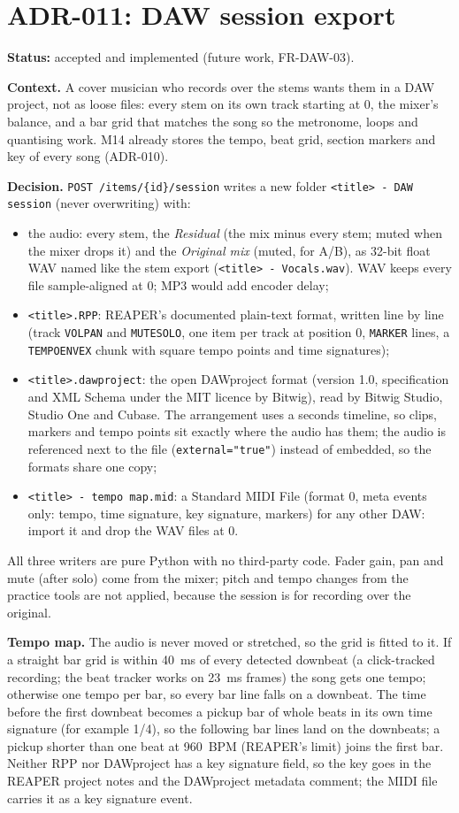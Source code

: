 \section{ADR-011: DAW session export}
\textbf{Status:} accepted and implemented (future work, FR-DAW-03).

\textbf{Context.} A cover musician who records over the stems wants them in a
DAW project, not as loose files: every stem on its own track starting at 0, the
mixer's balance, and a bar grid that matches the song so the metronome, loops
and quantising work. M14 already stores the tempo, beat grid, section markers
and key of every song (ADR-010).

\textbf{Decision.} \texttt{POST /items/\{id\}/session} writes a new folder
\texttt{<title> - DAW session} (never overwriting) with:
\begin{itemize}
  \item the audio: every stem, the \emph{Residual} (the mix minus every stem;
  muted when the mixer drops it) and the \emph{Original mix} (muted, for A/B),
  as 32-bit float WAV named like the stem export
  (\texttt{<title> - Vocals.wav}). WAV keeps every file sample-aligned at 0;
  MP3 would add encoder delay;
  \item \texttt{<title>.RPP}: REAPER's documented plain-text format, written
  line by line (track \texttt{VOLPAN} and \texttt{MUTESOLO}, one item per track
  at position 0, \texttt{MARKER} lines, a \texttt{TEMPOENVEX} chunk with square
  tempo points and time signatures);
  \item \texttt{<title>.dawproject}: the open DAWproject format (version 1.0,
  specification and XML Schema under the MIT licence by Bitwig), read by
  Bitwig Studio, Studio One and Cubase. The arrangement uses a seconds
  timeline, so clips, markers and tempo points sit exactly where the audio has
  them; the audio is referenced next to the file (\texttt{external="true"})
  instead of embedded, so the formats share one copy;
  \item \texttt{<title> - tempo map.mid}: a Standard MIDI File (format 0, meta
  events only: tempo, time signature, key signature, markers) for any other
  DAW: import it and drop the WAV files at 0.
\end{itemize}
All three writers are pure Python with no third-party code. Fader gain, pan and
mute (after solo) come from the mixer; pitch and tempo changes from the
practice tools are not applied, because the session is for recording over the
original.

\textbf{Tempo map.} The audio is never moved or stretched, so the grid is fitted
to it. If a straight bar grid is within 40~ms of every detected downbeat (a
click-tracked recording; the beat tracker works on 23~ms frames) the song gets
one tempo; otherwise one tempo per bar, so every bar line falls on a downbeat.
The time before the first downbeat becomes a pickup bar of whole beats in its
own time signature (for example 1/4), so the following bar lines land on the
downbeats; a pickup shorter than one beat at 960~BPM (REAPER's limit) joins the
first bar. Neither RPP nor DAWproject has a key signature field, so the key goes
in the REAPER project notes and the DAWproject metadata comment; the MIDI file
carries it as a key signature event.

